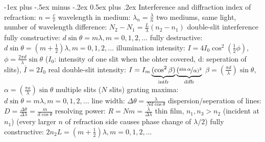 \documentclass[10pt,landscape]{article}
\makeatletter
\renewcommand{\subsection}{\@startsection{subsection}{2}{0mm}%
                                {-1ex plus -.5ex minus -.2ex}%
                                {0.5ex plus .2ex}%
                                {\normalfont\normalsize\bfseries}}
\newcommand{\spc}{\hspace*{1em}}
\makeatother
\begin{document}
\begin{multicols*}{3}
\subsection{Interference and diffraction}
index of refraction: $n=\frac{c}{v}$
\newline
wavelength in medium: $\lambda _n=\frac{\lambda }{n}$
\newline
two mediums, same light, number of wavelength difference: 
\newline
\spc $N_2-N_1=\frac{L}{\lambda }(n_2-n_1)$
\newline \newline
double-slit interference
\newline
\spc fully constructive: $d\sin\theta =m\lambda,m=0,1,2,...$
\newline
\spc fully destructive: $d\sin\theta =(m+\frac{1}{2})\lambda,m=0,1,2,...$
\newline
\spc illumination intensity: $I=4I_0\cos ^2(\frac{1}{2}\phi)$, $\phi=\frac{2 \pi d}{\lambda} \sin \theta $ 
\newline
\spc\spc ($I_0$: intensity of one slit when the ohter covered, d: seperation of slits), $\overline{I}=2I_0$
\newline \newline
real double-slit
\newline
\spc intensity: $I=I_m\underbrace{(\cos ^2 \beta )}_{\textrm{intfr}}\underbrace{(\nicefrac{\sin \alpha}{\alpha)^2}}_{\textrm{diffr}}$
\newline
\spc \spc $\beta =(\frac{\pi d}{\lambda })\sin \theta $, $\alpha =(\frac{\pi a}{\lambda})\sin \theta $
\newline \newline
multiple slits ($N$ slits)
\newline
\spc grating maxima: $d\sin\theta =m\lambda,m=0,1,2,...$
\newline
\spc line width: $\Delta \theta =\frac{\lambda }{Nd\cos \theta }$
\newline
\spc dispersion/seperation of lines: $D=\frac{\Delta \theta }{\Delta \lambda }=\frac{m}{d\cos \theta }$
\newline
\spc resolving power: $R=Nm=\frac{\overline{\lambda} }{\Delta \lambda }$
\newline \newline
thin film, $n_1,n_3>n_2$ (incident at $n_1$)
\newline
(every larger $n$ of refraction side causes phase change of $\lambda/2$)
\newline
\spc fully constructive: $2n_2L=(m+\frac{1}{2})\lambda ,m=0,1,2,...$

\end{multicols*}
\end{document}
